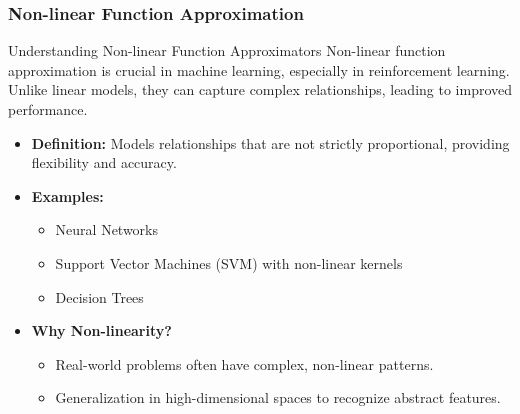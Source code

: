\documentclass[aspectratio=169]{beamer}
\begin{document}
\begin{frame}[fragile]
    \frametitle{Non-linear Function Approximation}
    
    \begin{block}{Understanding Non-linear Function Approximators}
        Non-linear function approximation is crucial in machine learning, especially in reinforcement learning. Unlike linear models, they can capture complex relationships, leading to improved performance.
    \end{block}
    
    \begin{itemize}
        \item \textbf{Definition:} Models relationships that are not strictly proportional, providing flexibility and accuracy.
        \item \textbf{Examples:}
            \begin{itemize}
                \item Neural Networks
                \item Support Vector Machines (SVM) with non-linear kernels
                \item Decision Trees
            \end{itemize}
        \item \textbf{Why Non-linearity?}
            \begin{itemize}
                \item Real-world problems often have complex, non-linear patterns.
                \item Generalization in high-dimensional spaces to recognize abstract features.
            \end{itemize}
    \end{itemize}
\end{frame}
\end{document}
